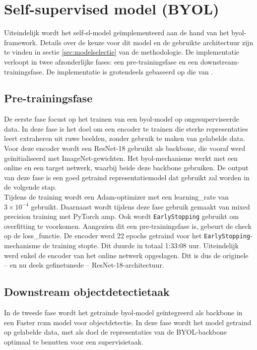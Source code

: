 \section{Self-supervised model (BYOL)}

Uiteindelijk wordt het \gls{self-sl}-model geïmplementeerd aan de hand van het \gls{byol}-framework. Details over de keuze voor dit model en de gebruikte architectuur zijn te vinden in sectie \ref{sec:modelselectie} van de methodologie. De implementatie verloopt in twee afzonderlijke fases: een pre-trainingsfase en een downstream-trainingsfase. De implementatie is grotendeels gebaseerd op die van \textcite{Adaloglou_2022}.

\subsection{Pre-trainingsfase}

De eerste fase focust op het trainen van een \gls{byol}-model op ongesuperviseerde data. In deze fase is het doel om een encoder te trainen die sterke representaties leert extraheren uit ruwe beelden, zonder gebruik te maken van gelabelde data. Voor deze encoder wordt een ResNet-18 gebruikt als backbone, die vooraf werd geïnitialiseerd met ImageNet-gewichten. Het \gls{byol}-mechanisme werkt met een online en een target netwerk, waarbij beide deze backbone gebruiken. De output van deze fase is een goed getraind representatiemodel dat gebruikt zal worden in de volgende stap. \\

Tijdens de training wordt een Adam-optimizer met een \gls{learning_rate} van $3 \times 10^{-4}$ gebruikt. Daarnaast wordt tijdens deze fase gebruik gemaakt van mixed precision training met PyTorch \gls{amp}. Ook wordt \texttt{EarlyStopping} gebruikt om \gls{overfitting} te voorkomen. Aangezien dit een pre-trainingsfase is, gebeurt de check op de \gls{loss_functie}. De encoder werd 22 epochs getraind voor het \texttt{EarlyStopping}-mechanisme de training stopte. Dit duurde in totaal 1:33:08 uur. Uiteindelijk werd enkel de encoder van het online netwerk opgeslagen. Dit is dus de originele -- en nu deels gefinetunede -- ResNet-18-architectuur.

\subsection{Downstream objectdetectietaak}

In de tweede fase wordt het getrainde \gls{byol}-model geïntegreerd als backbone in een Faster \gls{rcnn} model voor objectdetectie. In deze fase wordt het model getraind op gelabelde data, met als doel de representaties van de BYOL-backbone optimaal te benutten voor een supervisietaak.

